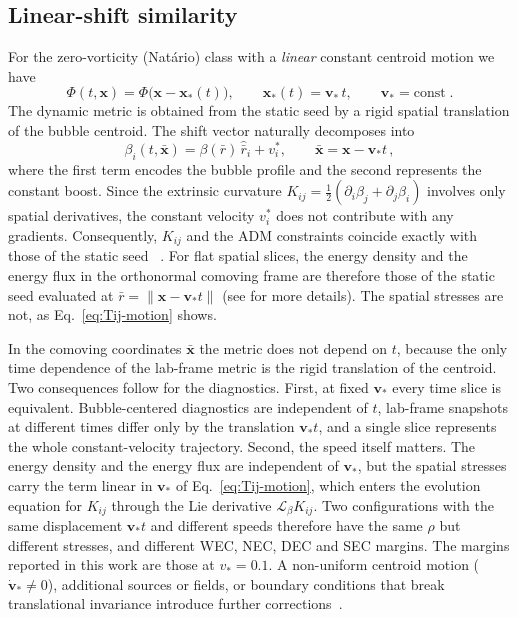 \documentclass[11pt]{article}
\makeatletter
\newcommand{\@abbr}[1]{\ifmmode\mathrm{#1}\else\textsc{#1}\fi}
\newcommand{\WEC}{\@abbr{WEC}}
\newcommand{\NEC}{\@abbr{NEC}}
\newcommand{\SEC}{\@abbr{SEC}}
\newcommand{\DEC}{\@abbr{DEC}}
\makeatother
\begin{document}
\subsection{Linear-shift similarity}
\label{sec:vt-similarity}
For the zero-vorticity (Nat\'ario) class with a \emph{linear} constant centroid motion we have
\begin{equation}
    \Phi(t,\mathbf x)=\Phi\big(\mathbf x-\mathbf x_*(t)\big),\qquad \mathbf x_*(t)=\mathbf v_*\,t,\qquad \mathbf v_* = \text{const}\;.
\end{equation}
The dynamic metric is obtained from the static seed by a rigid spatial translation of the bubble centroid. The shift vector naturally decomposes into
\begin{equation}
    \beta_i(t,\bar{\mathbf x})=\beta(\bar r)\,\hat{\bar r}_i + v^*_{i},\qquad \bar{\mathbf x}=\mathbf x-\mathbf v_* t\,,
\end{equation}
where the first term encodes the bubble profile and the second represents the constant boost. Since the extrinsic curvature $K_{ij}=\tfrac12(\partial_i\beta_j+\partial_j\beta_i)$ involves only spatial derivatives, the constant velocity $v^*_i$ does not contribute with any gradients. Consequently, $K_{ij}$ and the ADM constraints coincide exactly with those of the static seed ~\cite{Arnowitt:1962hi,Wald1984ucp,Alcub2008itnr}. For flat spatial slices, the energy density and the energy flux in the orthonormal comoving frame are therefore those of the static seed evaluated at $\bar r=\|\mathbf x-\mathbf v_* t\|$ (see \cite{Santiago:2021aup,Schuster:2023ADMmass} for more details). The spatial stresses are not, as Eq.~\eqref{eq:Tij-motion} shows.

In the comoving coordinates $\bar{\mathbf x}$ the metric does not depend on $t$, because the only time dependence of the lab-frame metric is the rigid translation of the centroid. Two consequences follow for the diagnostics. First, at fixed $\mathbf v_*$ every time slice is equivalent. Bubble-centered diagnostics are independent of $t$, lab-frame snapshots at different times differ only by the translation $\mathbf v_* t$, and a single slice represents the whole constant-velocity trajectory. Second, the speed itself matters. The energy density and the energy flux are independent of $\mathbf v_*$, but the spatial stresses carry the term linear in $\mathbf v_*$ of Eq.~\eqref{eq:Tij-motion}, which enters the evolution equation for $K_{ij}$ through the Lie derivative $\mathcal{L}_\beta K_{ij}$. Two configurations with the same displacement $\mathbf v_* t$ and different speeds therefore have the same $\rho$ but different stresses, and different \WEC, \NEC, \DEC{} and \SEC{} margins. The margins reported in this work are those at $v_*=0.1$. A non-uniform centroid motion ($\dot{\mathbf v}_*\neq0$), additional sources or fields, or boundary conditions that break translational invariance introduce further corrections~\cite{Santiago:2021aup}.
\end{document}
